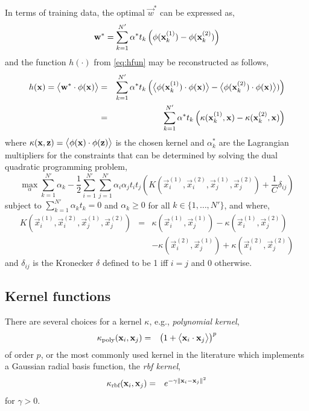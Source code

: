 In terms of training data, the optimal $\vec{w}^*$ can be expressed as, 
\begin{equation}
	\mathbf{w}^*=\sum_{k=1}^{N'} \alpha^* t_k \left( {\mathbf{\phi}}(\mathbf{x}_k^{(1)})-{\mathbf{\phi}}(\mathbf{x}_k^{(2)}) \right)
\end{equation}
and the function $h(\cdot)$ from \cref{eq:hfun} may be reconstructed as follows,
\begin{eqnarray}\label{eq:nonlinear}
	h(\vec{x})=\inner{\vec{w}^*}{\vphi(\vec{x})} &=& 
	\sum_{k=1}^{N'} \alpha^* t_k \left( \inner{\vphi(\vec{x}_k^{(1)})}{\vphi(\vec{x})}-\inner{\vphi(\vec{x}_k^{(2)})}{\vphi(\vec{x})} ) \right) \nonumber \\ 
	&=&\sum_{k=1}^{N'} \alpha^* t_k \left( \kappa(\vec{x}_k^{(1)},\vec{x})-\kappa(\vec{x}_k^{(2)},\vec{x}) \right)
\end{eqnarray}
where $\kappa(\mathbf{x},\mathbf{z})=\big<{{\mathbf{\phi}}(\mathbf{x})}\cdot{{\mathbf{\phi}}(\mathbf{z})}\big>$ is the chosen kernel and $\alpha_k^*$ are the Lagrangian multi\-pliers for the constraints that can be determined by solving the dual quadratic programming problem,
\begin{equation}\label{eq:margin:nonlinear}
	\max_{\alpha} \sum_{k=1}^{N'} \alpha_k -\frac{1}{2} 
	\sum_{i=1}^{N'}\sum_{j=1}^{N'} \alpha_i\alpha_jt_it_j\left(
  K\left(\vec{x}_i^{(1)},\vec{x}_i^{(2)},\vec{x}_j^{(1)},\vec{x}_j^{(2)}\right) 
  +\frac{1}{C}\delta_{ij}\right)
\end{equation} 
subject to $\sum_{k=1}^{N'} \alpha_kt_k=0$ and $\alpha_k\geq0$ for all $k\in\{1,\ldots,N'\}$, and where,
\begin{eqnarray}
K\left(\vec{x}_i^{(1)},\vec{x}_i^{(2)},\vec{x}_j^{(1)},\vec{x}_j^{(2)}\right)  
&=& 
  \kappa\left(\vec{x}_i^{(1)},\vec{x}_j^{(1)}\right)
  -\kappa\left(\vec{x}_i^{(1)},\vec{x}_j^{(2)}\right) \\ && \nonumber
  -\kappa\left(\vec{x}_i^{(2)},\vec{x}_j^{(1)}\right)
  +\kappa\left(\vec{x}_i^{(2)},\vec{x}_j^{(2)}\right)
\end{eqnarray}
and $\delta_{ij}$ is the Kronecker $\delta$ defined to be 1 iff $i=j$ and 0 otherwise.

\subsection*{Kernel functions}
There are several choices for a kernel $\kappa$, e.g., \emph{polynomial kernel},
\begin{eqnarray}
	\kappa_{\text{poly}}(\mathbf{x}_i,\mathbf{x}_j)&=& \left(1+\big<{\mathbf{x}_i}\cdot{\mathbf{x}_j}\big> \right)^p
\end{eqnarray}
of order $p$, or the most commonly used kernel in the literature which implements a Gauss\-ian radial basis function, the \emph{rbf kernel},
\begin{eqnarray}
	\kappa_{\text{rbf}}(\mathbf{x}_i,\mathbf{x}_j)&=& e^{-\gamma \lVert\mathbf{x}_i-\mathbf{x}_j\rVert^2}
\end{eqnarray}
for $\gamma>0$.

